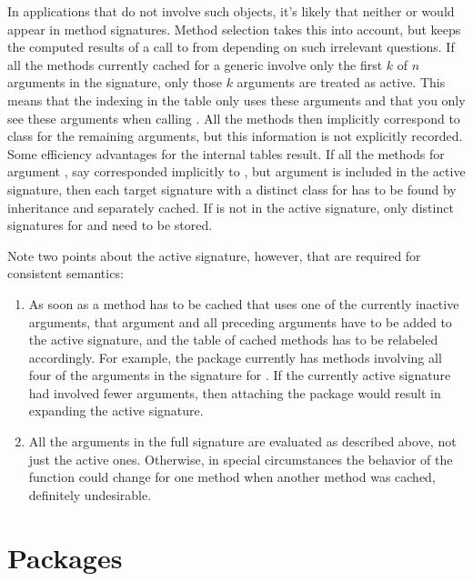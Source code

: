 \documentclass[11pt]{article}
\begin{document}
In applications that do not involve such objects, it's likely that neither  or  would appear in method signatures.
Method selection takes this into account, but keeps the computed results of a call to \SOperator{[} from depending on such irrelevant questions.
If all the methods currently cached for a generic involve only the first $k$ of $n$ arguments in the signature, only those $k$ arguments are treated as active.
This means that the indexing in the table only uses these arguments and that you only see these arguments when calling .
All the methods then implicitly correspond to class  for the remaining arguments, but this information is not explicitly recorded.
Some efficiency advantages for the internal tables result.
If all the methods for argument , say corresponded implicitly to , but argument  is included in the active signature, then each target signature with a distinct class for  has to be found by inheritance and separately cached.
If  is not in the active signature, only distinct signatures for  and  need to be stored.

Note two points about the active signature, however, that are required for consistent semantics:
\begin{enumerate}
\item As soon as a method has to be cached that uses one of the currently inactive arguments, that argument and all preceding arguments have to be added to the active signature, and the table of cached methods has to be relabeled accordingly.
For example, the  package currently has methods involving all four of the arguments in the signature for \SOperator{[}.  If the currently active signature had involved fewer arguments, then attaching the  package would result in expanding the active signature.
\item All the arguments in the full signature are evaluated as described above, not just the active ones.  Otherwise, in special circumstances the behavior of the function could change for one method when another method was cached, definitely undesirable.
\end{enumerate}

\section{Packages}
\label{sec:packages}
\end{document}
